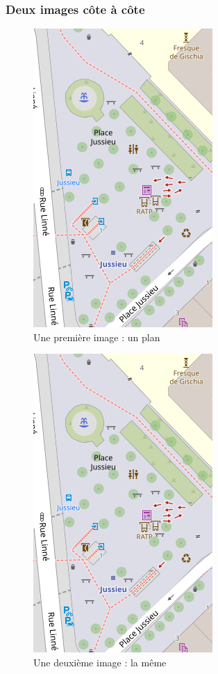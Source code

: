 \begin{frame}
  \frametitle{Deux images côte à côte}

  \begin{minipage}{0.49\textwidth}
	  \begin{figure}
		  \includegraphics[scale=0.35]{pour_exemples/mini_plan.png}
		  \caption*{Une première image : un plan}
	  \end{figure}
  \end{minipage}
  \hfill
  \begin{minipage}{0.49\textwidth}
    \begin{figure}
		  \includegraphics[scale=0.35]{pour_exemples/mini_plan.png}
		  \caption*{Une deuxième image : la même}
	  \end{figure}
  \end{minipage}
\end{frame}

